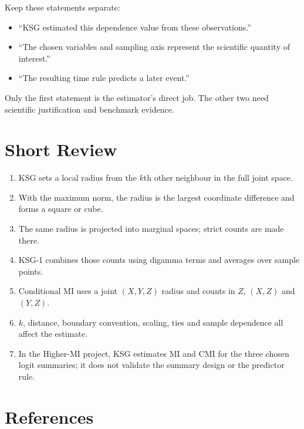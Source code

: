 \documentclass[11pt,letterpaper,oneside]{report}
\begin{document}
Keep these statements separate:
\begin{itemize}
\item “KSG estimated this dependence value from these observations.”
\item “The chosen variables and sampling axis represent the scientific quantity of interest.”
\item “The resulting time rule predicts a later event.”
\end{itemize}
Only the first statement is the estimator's direct job. The other two need scientific justification and benchmark evidence.

\section{Short Review}

\begin{enumerate}
\item KSG sets a local radius from the $k$th other neighbour in the full joint space.
\item With the maximum norm, the radius is the largest coordinate difference and forms a square or cube.
\item The same radius is projected into marginal spaces; strict counts are made there.
\item KSG-1 combines those counts using digamma terms and averages over sample points.
\item Conditional MI uses a joint $(X,Y,Z)$ radius and counts in $Z$, $(X,Z)$ and $(Y,Z)$.
\item $k$, distance, boundary convention, scaling, ties and sample dependence all affect the estimate.
\item In the Higher-MI project, KSG estimates MI and CMI for the three chosen logit summaries; it does not validate the summary design or the predictor rule.
\end{enumerate}

\section{References}
\end{document}
